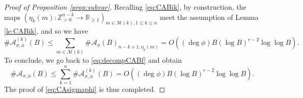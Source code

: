 \documentclass[10pt,a4paper]{amsart}
\newcommand{\BR}{{\mathbb {R}}}
\newcommand{\BZ}{{\mathbb {Z}}}
\newcommand{\CA}{{\mathcal {A}}}
\newcommand{\CM}{{\mathcal {M}}}
\begin{document}
\begin{proof}[Proof of Proposition \ref{prop:subvar}]
	Recalling \eqref{eq:CABik}, by construction, the maps $(\eta_{k}(m):\BZ_{>0}^{n-k}\to\BR_{\geqslant 1})_{m\in \CM(k),1\leqslant k\leqslant n}$ meet the assumption of Lemma \ref{le:CABik}, and so we have $$\#\CA_{\sigma,\phi}^{(k)}(B)\leqslant \sum_{m\in\CM(k)} \#\CA_\sigma(B)_{n-k+1,\eta_k(m)}=O\left((\deg \phi)B(\log B)^{r-2}\log\log B\right).$$
	To conclude, we go back to \eqref{eq:decompCABf} and obtain
	$$\#\CA_{\sigma,\phi}(B)\leqslant \sum_{k=1}^{n}\#\CA_{\sigma,\phi}^{(k)}(B)=O\left((\deg \phi)B(\log B)^{r-2}\log\log B\right).$$
	The proof of \eqref{eq:CAsigmaphi} is thus completed.
\end{proof}
\end{document}
